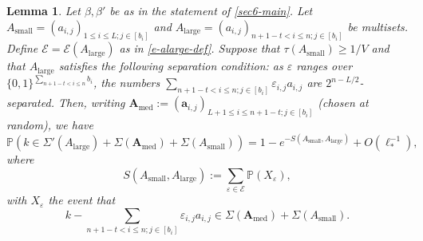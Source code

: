 \documentclass[11pt,reqno]{amsart}
\numberwithin{equation}{section}
\newtheorem{lemma}[theorem]{Lemma}
\theoremstyle{definition}
\theoremstyle{remark}
\newcommand{\mb}{\mathbb}
\newcommand{\mbf}{\mathbf}
\newcommand{\eps}{\varepsilon}
\renewcommand{\le}{\leqslant}
\renewcommand{\ge}{\geqslant}
\def\sml{\operatorname{small}}
\def\lrg{\operatorname{large}}
\def\med{\operatorname{med}}
\begin{document}
\begin{lemma}\label{key-61-tech} Let $\beta, \beta'$ be as in the statement of \cref{sec6-main}. Let $A_{\sml} = (a_{i,j})_{1 \le i \le L;j \in [b_i]}$ and $A_{\lrg} = (a_{i,j})_{n + 1 - t < i \le n;j \in [b_i]}$ be multisets. Define $\mathcal{E} = \mathcal{E}(A_{\lrg})$ as in \cref{e-alarge-def}.
Suppose that $\tau(A_{\sml}) \ge 1/V$ and that $A_{\lrg}$ satisfies the following separation condition: as $\eps$ ranges over $\{0,1\}^{\sum_{n +1 - t < i \le n} b_i}$, the numbers $\sum_{n +1 - t < i \le n ;j \in [b_i]} \eps_{i,j} a_{i,j}$ are $2^{n - L/2}$-separated. Then, writing $\mbf{A}_{\med} := (\mbf{a}_{i,j})_{L+1 \le i \le  n + 1 - t; j \in [b_i]}$ \textup{(}chosen at random\textup{)}, we have
\[ \mb{P}(k \in \Sigma'(A_{\lrg}) + \Sigma(\mbf{A}_{\med}) + \Sigma(A_{\sml})) = 1 - e^{-S(A_{\sml}, A_{\lrg})} + O(\ell_*^{-1}),\] where 
\begin{equation}\label{score-def-1} S(A_{\sml}, A_{\lrg}) := 
\sum_{\eps \in \mathcal{E}} \mb{P}(X_{\eps}), \end{equation} with
$X_{\eps}$ the event that 
\begin{equation}\label{score-def-2}  k - \sum_{n + 1 - t < i \le n;j\in [b_i]} \eps_{i,j} a_{i,j} \in \Sigma(\mbf{A}_{\med}) + \Sigma(A_{\sml}) .\end{equation}
\end{lemma}
\end{document}

